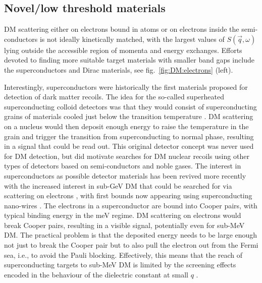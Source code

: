 \subsection{Novel/low threshold materials} 
\label{sec:novel:material}
DM scattering either on electrons bound in atoms or on electrons inside the semi-conductors is not ideally kinetically matched, with the largest values of $S(\vec q, \omega)$ lying outside the accessible region of momenta and energy exchanges.  
Efforts devoted to finding more suitable target materials with smaller band gaps include the superconductors and Dirac materials, 
see fig.~\ref{fig:DM:electrons} (left). 


Interestingly, superconductors were historically the first materials proposed for detection of dark matter recoils. The idea for the so-called superheated superconducting colloid detectors was that they would consist of superconducting grains of materials cooled just below the transition temperature \cite{DM:nucleon:superconductors}. DM scattering on a nucleus would then deposit enough energy to raise the temperature in the grain and trigger the transition from superconducting to normal phase, resulting in a signal that could be read out. This original detector concept was never used for DM detection, but did motivate searches for DM nuclear recoils using other types of detectors based on semi-conductors and noble gases. The interest in superconductors as possible detector materials has been revived more recently with the increased interest in sub-GeV DM that could be searched for via scattering on electrons \cite{DM:electron:superconductors}, with first bounds now appearing using superconducting nano-wires \cite{DM:electron:superconductors:nanowiresHochberg,Gelmini:2020xir,LAMPOST}. The electrons in a superconductor are bound into Cooper pairs, with typical binding energy in the meV regime. DM scattering on electrons would break Cooper pairs, resulting in a visible signal, potentially even for sub-MeV DM. The practical problem is that the deposited energy needs to be large enough not just to break the Cooper pair but to also pull the electron out from 
the Fermi sea, i.e., to avoid the Pauli blocking. Effectively, this means that the reach of superconducting targets to sub-MeV DM is limited by the screening effects encoded in the behaviour of the dielectric constant at small $q$ \cite{Knapen:2021run}. 


